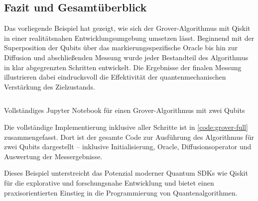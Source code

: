 \subsection{Fazit und Gesamtüberblick}

Das vorliegende Beispiel hat gezeigt, wie sich der Grover-Algorithmus mit Qiskit in einer realitätsnahen Entwicklungsumgebung umsetzen lässt. Beginnend mit der Superposition der Qubits über das markierungsspezifische Oracle bis hin zur Diffusion und abschließenden Messung wurde jeder Bestandteil des Algorithmus in klar abgegrenzten Schritten entwickelt. Die Ergebnisse der finalen Messung illustrieren dabei eindrucksvoll die Effektivität der quantenmechanischen Verstärkung des Zielzustands.

\begin{listing}[ht!]
  \inputminted{python}{code/grover-full.py}
  \caption{Vollständiges Jupyter Notebook für einen Grover-Algorithmus mit zwei Qubits}
  \label{code:grover-full}
\end{listing}

Die vollständige Implementierung inklusive aller Schritte ist in \autoref{code:grover-full} zusammengefasst. Dort ist der gesamte Code zur Ausführung des Algorithmus für zwei Qubits dargestellt – inklusive Initialisierung, Oracle, Diffusionsoperator und Auswertung der Messergebnisse.

Dieses Beispiel unterstreicht das Potenzial moderner Quantum SDKs wie Qiskit für die explorative und forschungsnahe Entwicklung und bietet einen praxisorientierten Einstieg in die Programmierung von Quantenalgorithmen.

\clearpage
\printbibliography
